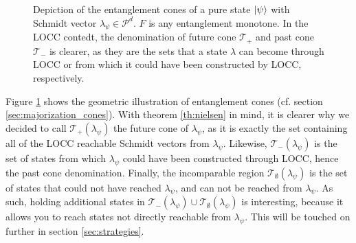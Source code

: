 \begin{figure}[h!]
    \centering
    \caption{Depiction of the entanglement cones of a pure state $\ket{\psi}$ with Schmidt vector $\lambda_\psi \in \mathcal{P}^d$. $F$ is any entanglement monotone. In the LOCC contedt, the denomination of future cone $\mathcal{T}_+$ and past cone $\mathcal{T}_-$ is clearer, as they are the sets that a state $\lambda$ can become through LOCC or from which it could have been constructed by LOCC, respectively.}
    \label{fig:nielsen_cones_example}
\end{figure}

Figure \ref{fig:nielsen_cones_example} shows the geometric illustration of entanglement cones (cf. section \ref{sec:majorization_cones}). With theorem \ref{th:nielsen} in mind, it is clearer why we decided to call $\mathcal{T}_+ (\lambda_\psi)$ the future cone of $\lambda_\psi$, as it is exactly the set containing all of the LOCC reachable Schmidt vectors from $\lambda_\psi$. Likewise, $\mathcal{T}_- (\lambda_\psi)$ is the set of states from which $\lambda_\psi$ could have been constructed through LOCC, hence the past cone denomination. Finally, the incomparable region $\mathcal{T}_\emptyset (\lambda_\psi)$ is the set of states that could not have reached $\lambda_\psi$, and can not be reached from $\lambda_\psi$.  As such, holding additional states in $\mathcal{T}_- (\lambda_\psi) \cup \mathcal{T}_\emptyset (\lambda_\psi)$ is interesting, because it allows you to reach states not directly reachable from $\lambda_\psi$. This will be touched on further in section \ref{sec:strategies}. 

